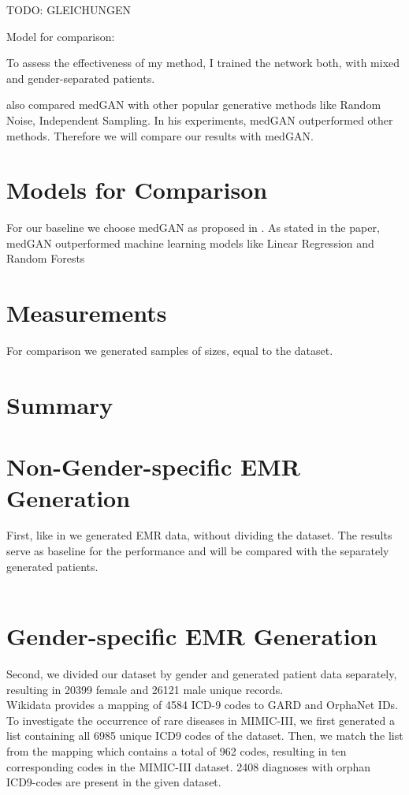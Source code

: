 \documentclass[11pt, a4paper]{book}
\begin{document}
TODO: GLEICHUNGEN

Model for comparison: 

To assess the effectiveness of my method, I trained the network both, with mixed and gender-separated patients. 

\cite{Choi2017} also compared medGAN with other popular generative methods like Random Noise, Independent Sampling. In his experiments, medGAN outperformed other methods. Therefore we will compare our results with medGAN.

\section{Models for Comparison}
For our baseline we choose medGAN as proposed in \cite{Choi2017}. As stated in the paper, medGAN outperformed machine learning models like Linear Regression and Random Forests
\section{Measurements}
For comparison we generated samples of sizes, equal to the dataset.

\section{Summary}

\section{Non-Gender-specific EMR Generation}
First, like in \cite{Choi2017} we generated EMR data, without dividing the dataset. The results serve as baseline for the performance and will be compared with the separately generated patients.
\\
\\



\section{Gender-specific EMR Generation}
Second, we divided our dataset by gender and generated patient data separately, resulting in 20399 female and 26121 male unique records.
\\
Wikidata provides a mapping of 4584 ICD-9 codes to GARD and OrphaNet IDs.
To investigate the occurrence of rare diseases in MIMIC-III, we first generated a list containing all 6985 unique ICD9 codes of the dataset. Then, we match the list from the mapping which contains a total of 962 codes, resulting in ten corresponding codes in the MIMIC-III dataset. 2408 diagnoses with orphan ICD9-codes are present in the given dataset.
\end{document}
